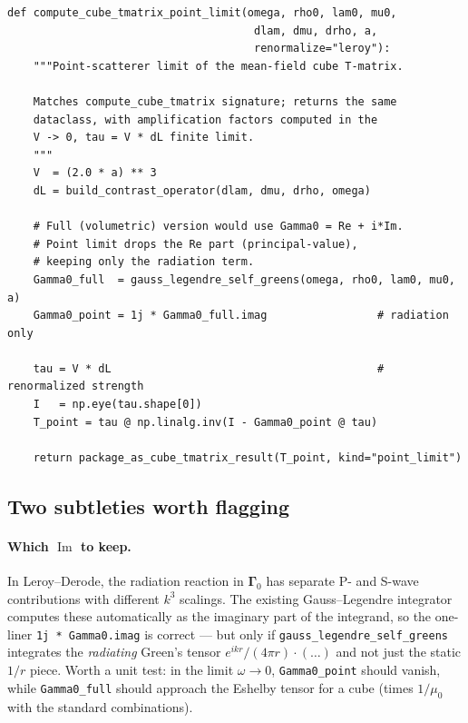 \documentclass[11pt,a4paper]{article}
\newcommand{\Gam}{\bm{\Gamma}}
\DeclareMathOperator{\Im}{Im}
\begin{document}
\begin{lstlisting}[caption={Point-scatterer limit: drop-in companion to \texttt{compute\_cube\_tmatrix}.}]
def compute_cube_tmatrix_point_limit(omega, rho0, lam0, mu0,
                                      dlam, dmu, drho, a,
                                      renormalize="leroy"):
    """Point-scatterer limit of the mean-field cube T-matrix.

    Matches compute_cube_tmatrix signature; returns the same
    dataclass, with amplification factors computed in the
    V -> 0, tau = V * dL finite limit.
    """
    V  = (2.0 * a) ** 3
    dL = build_contrast_operator(dlam, dmu, drho, omega)

    # Full (volumetric) version would use Gamma0 = Re + i*Im.
    # Point limit drops the Re part (principal-value),
    # keeping only the radiation term.
    Gamma0_full  = gauss_legendre_self_greens(omega, rho0, lam0, mu0, a)
    Gamma0_point = 1j * Gamma0_full.imag                 # radiation only

    tau = V * dL                                         # renormalized strength
    I   = np.eye(tau.shape[0])
    T_point = tau @ np.linalg.inv(I - Gamma0_point @ tau)

    return package_as_cube_tmatrix_result(T_point, kind="point_limit")
\end{lstlisting}

\subsection{Two subtleties worth flagging}

\paragraph{Which \texorpdfstring{$\Im$}{Im} to keep.}
In Leroy--Derode, the radiation reaction in $\Gam_0$ has separate P-
and S-wave contributions with different $k^3$ scalings. The existing
Gauss--Legendre integrator computes these automatically as the
imaginary part of the integrand, so the one-liner
\texttt{1j * Gamma0.imag} is correct --- but only if
\texttt{gauss\_legendre\_self\_greens} integrates the \emph{radiating}
Green's tensor $e^{ikr}/(4\pi r)\cdot(\ldots)$ and not just the static
$1/r$ piece. Worth a unit test: in the limit $\omega \to 0$,
\texttt{Gamma0\_point} should vanish, while \texttt{Gamma0\_full}
should approach the Eshelby tensor for a cube (times $1/\mu_0$ with
the standard combinations).
\end{document}
